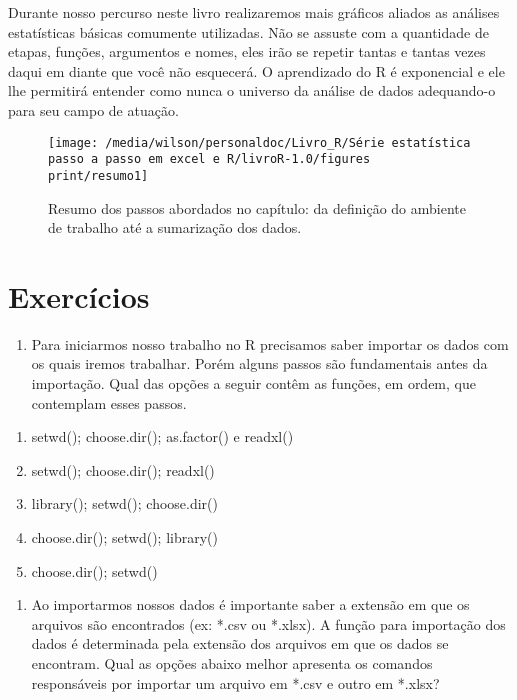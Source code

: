 \documentclass[14pt,titlepage, oneside, openany, a4paper]{book}
\providecommand{\tightlist}{%
  \setlength{\itemsep}{0pt}\setlength{\parskip}{0pt}}
\begin{document}
Durante nosso percurso neste livro realizaremos mais gráficos aliados as análises estatísticas básicas comumente utilizadas. Não se assuste com a quantidade de etapas, funções, argumentos e nomes, eles irão se repetir tantas e tantas vezes daqui em diante que você não esquecerá. O aprendizado do R é exponencial e ele lhe permitirá entender como nunca o universo da análise de dados adequando-o para seu campo de atuação.

\begin{figure}[H]

{\centering \texttt{[image: /media/wilson/personaldoc/Livro\_R/Série estatística passo a passo em excel e R/livroR-1.0/figures print/resumo1]} 

}

\caption{Resumo dos passos abordados no capítulo: da definição do ambiente de trabalho até a sumarização dos dados.}\label{fig:resumo1}
\end{figure}

\hypertarget{exercuxedcios-1}{%
\section{Exercícios}\label{exercuxedcios-1}}

\begin{enumerate}
\def\labelenumi{\arabic{enumi})}
\tightlist
\item
  Para iniciarmos nosso trabalho no R precisamos saber importar os dados com os quais iremos trabalhar. Porém alguns passos são fundamentais antes da importação. Qual das opções a seguir contêm as funções, em ordem, que contemplam esses passos.
\end{enumerate}

\begin{enumerate}
\def\labelenumi{(\alph{enumi})}
\tightlist
\item
  setwd(); choose.dir(); as.factor() e readxl()
\item
  setwd(); choose.dir(); readxl()
\item
  library(); setwd(); choose.dir()
\item
  choose.dir(); setwd(); library()
\item
  choose.dir(); setwd()
\end{enumerate}

\begin{enumerate}
\def\labelenumi{\arabic{enumi})}
\setcounter{enumi}{1}
\tightlist
\item
  Ao importarmos nossos dados é importante saber a extensão em que os arquivos são encontrados (ex: *.csv ou *.xlsx). A função para importação dos dados é determinada pela extensão dos arquivos em que os dados se encontram. Qual as opções abaixo melhor apresenta os comandos responsáveis por importar um arquivo em *.csv e outro em *.xlsx?
\end{enumerate}
\end{document}

